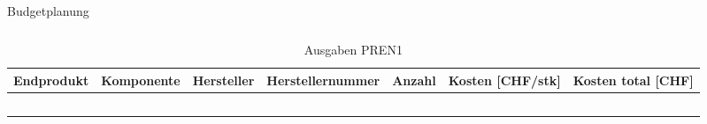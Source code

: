 \documentclass[main.tex]{subfiles} %
\begin{document}
\begin{landscape}
\begin{table}[h]
\begin{tabular}{|c|c|c|c|c|c|c|}
                            &                            &                        &                                    &                     &                            &                                 \\ \hline
                            \end{tabular}
    \caption{Budgetplanung}
    \label{tab:Budgetplanung}
\end{table}




\begin{table}[h]                                    %
    \centering
    \begin{tabular}{|c|c|c|c|c|c|c|}                        %
        \hline
        \textbf{Endprodukt} & \textbf{Komponente}        & \textbf{Hersteller}    & \textbf{Herstellernummer}          & \textbf{Anzahl}     & \textbf{Kosten [CHF/stk]}  & \textbf{Kosten total [CHF]}   \\ \hline
        &                            &                        &                                    &                     &                            &                                 \\ \hline
        &                            &                        &                                    &                     &                            &                                 \\ \hline
        &                            &                        &                                    &                     &                            &                                 \\ \hline
        &                            &                        &                                    &                     &                            &                                 \\ \hline
        &                            &                        &                                    &                     &                            &                                 \\ \hline
        \end{tabular}
\caption{Ausgaben PREN1}
\label{tab:Ausgabnen_PREN1}
\end{table}

\end{landscape}
\end{document}
